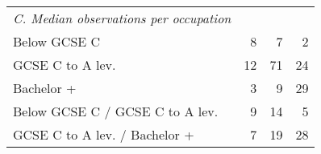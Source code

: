 \begin{center}
\begin{threeparttable}[!h]
\begin{tabular}{lrrr}
\textit{C. Median observations per occupation} \\
\hspace{3mm}Below GCSE C&           8         &           7         &           2         \\
\hspace{3mm}GCSE C to A lev.&          12         &          71         &          24         \\
\hspace{3mm}Bachelor +&           3         &           9         &          29         \\
\hspace{3mm}Below GCSE C / GCSE C to A lev.&           9         &          14         &           5         \\
\hspace{3mm}GCSE C to A lev. / Bachelor + \vspace{3mm}&           7         &          19         &          28         \\
\bottomrule
\bottomrule
\end{tabular}
\end{threeparttable}
\end{center}
